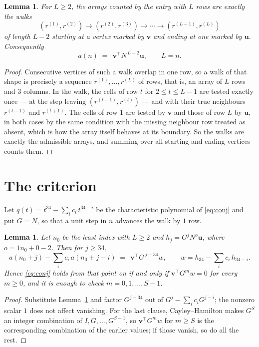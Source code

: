 \documentclass[11pt,a4paper]{article}
\theoremstyle{plain}
\newtheorem{lemma}[theorem]{Lemma}
\theoremstyle{definition}
\begin{document}
\begin{lemma}\label{lem:walk}
For $L\ge2$, the arrays counted by the entry with $L$ rows are exactly the walks
\[
(r^{(1)},r^{(2)})\to(r^{(2)},r^{(3)})\to\cdots\to(r^{(L-1)},r^{(L)})
\]
of length $L-2$ starting at a vertex marked by $\mathbf{v}$ and ending at one marked by
$\mathbf{u}$. Consequently
\[
a(n)\;=\;\,\mathbf{v}^{\!\top}N^{\,L-2}\mathbf{u},\qquad L=n .
\]
\end{lemma}

\begin{proof}
Consecutive vertices of such a walk overlap in one row, so a walk of that shape is
precisely a sequence $r^{(1)},\dots,r^{(L)}$ of rows, that is, an array of $L$ rows
and $3$ columns. In the walk, the cells of row $t$ for $2\le t\le L-1$ are tested
exactly once --- at the step leaving $(r^{(t-1)},r^{(t)})$ --- and with their true
neighbours $r^{(t-1)}$ and $r^{(t+1)}$. The cells of row $1$ are tested by
$\mathbf{v}$ and those of row $L$ by $\mathbf{u}$, in both cases by the same condition
with the missing neighbour row treated as absent, which is how the array itself behaves at
its boundary. So the walks are exactly the admissible arrays, and summing over all starting
and ending vertices counts them.
\end{proof}

\section{The criterion}

Let $q(t)=t^{34}-\sum_i c_i\,t^{34-i}$ be the characteristic polynomial of
\eqref{eq:conj} and put $G=N$, so that a unit step in $n$ advances the walk by
$1$ row.

\begin{lemma}\label{lem:crit}
Let $n_0$ be the least index with $L\ge2$ and $h_j=G^{j}N^{o}\mathbf{u}$, where
$o=1n_0+0-2$. Then for $j\ge34$,
\[
a(n_0+j)-\sum_i c_i\,a(n_0+j-i)\;=\;\,\mathbf{v}^{\!\top}G^{\,j-34}w,
\qquad w=h_{34}-\sum_i c_i\,h_{34-i} .
\]
Hence \eqref{eq:conj} holds from that point on if and only if
$\mathbf{v}^{\!\top}G^{m}w=0$ for every $m\ge0$, and it is enough to check
$m=0,1,\dots,S-1$.
\end{lemma}

\begin{proof}
Substitute Lemma~\ref{lem:walk} and factor $G^{j-34}$ out of
$G^{j}-\sum_ic_iG^{j-i}$; the nonzero scalar $1$ does not affect
vanishing. For the last clause, Cayley--Hamilton makes $G^{S}$ an integer combination of
$I,G,\dots,G^{S-1}$, so $\mathbf{v}^{\!\top}G^{m}w$ for $m\ge S$ is the corresponding
combination of the earlier values; if those vanish, so do all the rest.
\end{proof}
\end{document}

